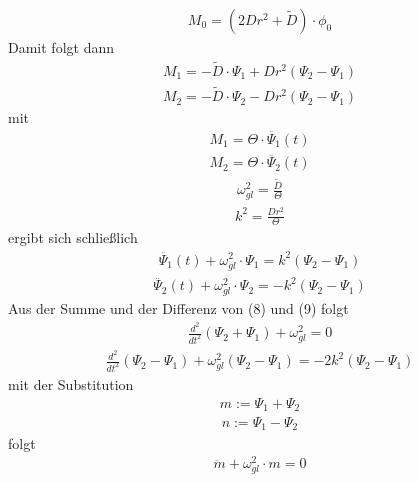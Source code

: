 \documentclass[a4paper,10pt]{scrartcl}
\begin{document}
\begin{itemize}
\begin{itemize}
					\begin{align}
					M_{0}=(2Dr^{2}+\tilde{D})\cdot \phi_{0}
					\end{align} 
					Damit folgt dann 
					\begin{align}
					M_{1}=-\tilde{D}\cdot \Psi_{1}+Dr^{2}(\Psi_{2}-\Psi_{1})
					\end{align}
					\begin{align}
					M_{2}=-\tilde{D}\cdot \Psi_{2}-Dr^{2}(\Psi_{2}-\Psi_{1})
					\end{align}
					mit 
					\begin{align*}
					M_{1}=\Theta\cdot \ddot{\Psi_{1}}(t)
					\end{align*}
					\begin{align*}
					M_{2}=\Theta \cdot \ddot{\Psi_{2}}(t)
					\end{align*}
					\begin{align*}
					\omega_{gl}^{2}=\frac{\tilde{D}}{\Theta}
					\end{align*}
					\begin{align*}
					k^{2}=\frac{Dr^{2}}{\Theta}
					\end{align*}
					ergibt sich schließlich
					\begin{align}
					\ddot{\Psi_{1}}(t)+\omega_{gl}^{2}\cdot \Psi_{1}=k^{2}(\Psi_{2}-\Psi_{1})
					\end{align}
					\begin{align}
					\ddot{\Psi_{2}}(t)+\omega_{gl}^{2}\cdot \Psi_{2}=-k^{2}(\Psi_{2}-\Psi_{1})
					\end{align}
					Aus der Summe und der Differenz von (8) und (9) folgt
					\begin{align}
					\frac{d^{2}}{dt^{2}}(\Psi_{2}+\Psi_{1})+\omega_{gl}^{2}=0
					\end{align}
					\begin{align}
					\frac{d^{2}}{dt^{2}}(\Psi_{2}-\Psi_{1})+\omega_{gl}^{2}(\Psi_{2}-\Psi_{1})=-2k^{2}(\Psi_{2}-\Psi_{1})
					\end{align}
					mit der Substitution
					\begin{align*}
					m:=\Psi_{1}+\Psi_{2}
					\end{align*}
					\begin{align*}
					n:=\Psi_{1}-\Psi_{2}
					\end{align*}
					folgt
					\begin{align}
					\ddot{m}+\omega_{gl}^{2}\cdot m=0
					\end{align}
					\begin{align}

\end{align}
\end{itemize}
\end{itemize}
\end{document}
